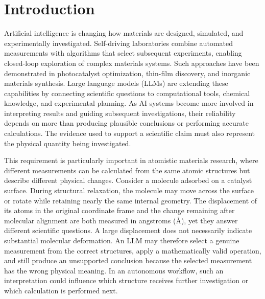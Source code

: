 
\section{Introduction}
\label{sec:introduction}

Artificial intelligence is changing how materials are designed, simulated, and experimentally investigated. Self-driving laboratories combine automated measurements with algorithms that select subsequent experiments, enabling closed-loop exploration of complex materials systems. Such approaches have been demonstrated in photocatalyst optimization, thin-film discovery, and inorganic materials synthesis.\cite{burger2020mobile,macleod2020self,alab2023autonomous} Large language models (LLMs) are extending these capabilities by connecting scientific questions to computational tools, chemical knowledge, and experimental planning.\cite{bran2024augmenting,boiko2023autonomous} As AI systems become more involved in interpreting results and guiding subsequent investigations, their reliability depends on more than producing plausible conclusions or performing accurate calculations. The evidence used to support a scientific claim must also represent the physical quantity being investigated.

This requirement is particularly important in atomistic materials research, where different measurements can be calculated from the same atomic structures but describe different physical changes. Consider a molecule adsorbed on a catalyst surface. During structural relaxation, the molecule may move across the surface or rotate while retaining nearly the same internal geometry. The displacement of its atoms in the original coordinate frame and the change remaining after molecular alignment are both measured in angstroms (\AA), yet they answer different scientific questions. A large displacement does not necessarily indicate substantial molecular deformation. An LLM may therefore select a genuine measurement from the correct structures, apply a mathematically valid operation, and still produce an unsupported conclusion because the selected measurement has the wrong physical meaning. In an autonomous workflow, such an interpretation could influence which structure receives further investigation or which calculation is performed next.

